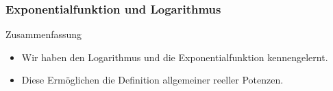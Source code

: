 \documentclass{beamer}
\renewcommand{\oe}{\"o}
\newcommand{\mytitle}{Exponentialfunktion und Logarithmus}
\begin{document}
\begin{frame}\frametitle{\mytitle}
	\begin{block}{Zusammenfassung}
	\begin{itemize}
		\item Wir haben den Logarithmus und die Exponentialfunktion kennengelernt.
		\item Diese Erm\oe glichen die Definition allgemeiner reeller Potenzen.
	\end{itemize}
	\end{block}
\end{frame}
\end{document}
